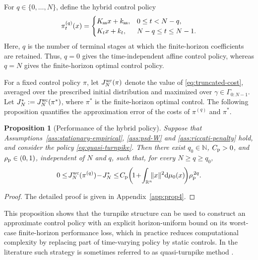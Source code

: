 \documentclass[10pt,journal,twoside]{IEEEtran}
\newtheorem{proposition}{Proposition}
\theoremstyle{definition}
\theoremstyle{remark}
\newcommand{\dd}{\mathrm{d}}
\begin{document}
For \(q\in\{0,\ldots,N\}\), define the hybrid control policy
\begin{equation}\label{eq:quasi-turnpike}
\pi_t^{(q)}(x)=
\begin{cases}
K_{\rm ss}x+k_{\rm ss},&0\le t<N-q,\\
K_tx+k_t,&N-q\le t\le N-1.
\end{cases}
\end{equation}
Here, \(q\) is the number of terminal stages at which the finite-horizon
coefficients are retained. Thus, \(q=0\) gives the time-independent affine control policy,
whereas \(q=N\) gives the finite-horizon optimal control policy.

For a fixed control policy \(\pi\), let \(J_N^{\rm wc}(\pi)\) denote the value
of \eqref{eq:truncated-cost}, averaged over the prescribed initial
distribution and maximized over \(\gamma\in\Gamma_{0:N-1}\). Let
\(J_N^*:=J_N^{\rm wc}(\pi^*)\), where \(\pi^*\) is the finite-horizon optimal control. The following proposition quantifies the approximation error of the costs of $\pi^{(q)}$ and $\pi^*$.



\begin{proposition}[Performance of the hybrid policy]\label{prp:quasi-turnpike-cost}
	Suppose that Assumptions~\ref{ass:stationary-empirical}, \ref{ass:psd-W} and \ref{ass:riccati-penalty} hold, and consider the policy \eqref{eq:quasi-turnpike}.
	Then there exist $q_0\in\mathbb{N}$, $C_{\rm p}>0$, and
	$\rho_{\rm p}\in(0,1)$, independent of $N$ and $q$, such that, for
	every $N\ge q\ge q_0$,
    \begin{align}\label{71}
     0\le \!J_N^{\rm wc}(\pi^{(q)})\!-\!J_N^\ast\le \!C_{\rm p}\!\left(\!1\!+\!\int_{\mathbb{R}^n}\!\!\!\|x\|^2\dd\mu_0(x)\!\right)\!\rho_{\rm p}^{\,2q}.   
    \end{align}
\end{proposition}

\begin{proof}
The detailed proof is given in
Appendix~\ref{app:prop4}.
\end{proof}


This proposition shows that the turnpike structure can be used to construct an approximate control policy with an explicit horizon-uniform bound on its worst-case finite-horizon performance loss, which in practice reduces computational complexity by replacing part of time-varying policy by static controls. In the literature such strategy is sometimes referred to as quasi-turnpike method \cite{TrelatZuazua2015, Esteve2022}.
\end{document}
